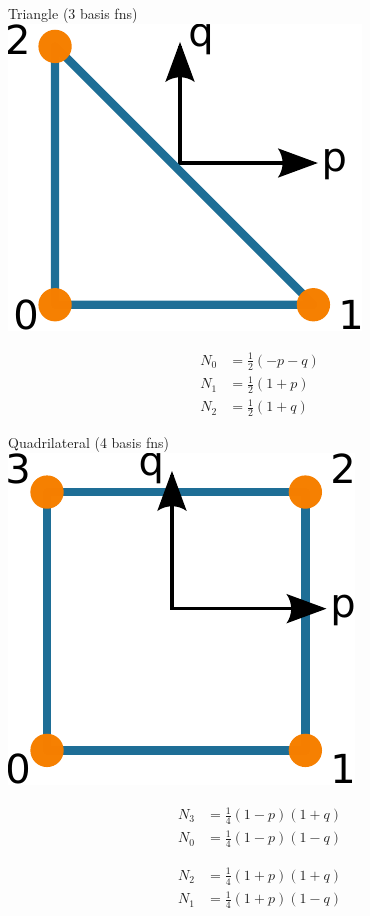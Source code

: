 \documentclass[pdftex,cig,slideColor]{pp4slides}
\begin{document}
  \vfill
 \begin{minipage}{3.0in}
    \begin{center}
      Triangle (3 basis fns)\\
      \includegraphics{figs/cell_tri3}
    \end{center}
    \begin{align*}
      N_0 &= \frac{1}{2}(-p-q) \\
      N_1 &= \frac{1}{2}(1+p) \\
      N_2 &= \frac{1}{2}(1+q)
    \end{align*}
  \end{minipage}
  \hfill
  \begin{minipage}{5.8in}
    \begin{center}
      Quadrilateral (4 basis fns)\\
      \includegraphics{figs/cell_quad4}
    \end{center}
    \begin{minipage}{2.7in}
      \begin{align*}
        N_3 &= \frac{1}{4}(1-p)(1+q) \\
        N_0 &= \frac{1}{4}(1-p)(1-q) 
      \end{align*}
    \end{minipage}
    \hfill
    \begin{minipage}{2.7in}
      \begin{align*}
        N_2 &= \frac{1}{4}(1+p)(1+q) \\
        N_1 &= \frac{1}{4}(1+p)(1-q)
     \end{align*}
    \end{minipage}
  \end{minipage}
\end{document}
